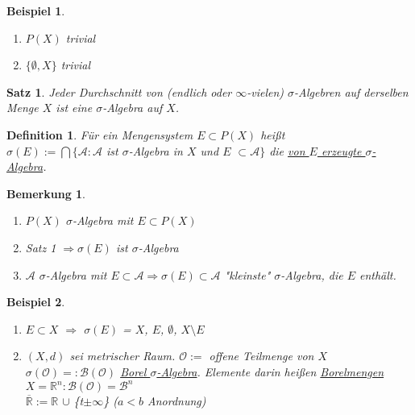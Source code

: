 \documentclass[11pt]{memoir}
\theoremstyle{break}
\newtheorem{Definition}{Definition}[chapter]
\newtheorem{Bemerkung}{Bemerkung}[chapter]
\newtheorem{Beispiel}{Beispiel}[chapter]
\newtheorem{Satz}{Satz}[chapter]
\begin{document}
\begin{Beispiel}
\begin{enumerate}
	\item $P(X)$ trivial
	\item $\{ \emptyset, X \}${} trivial
\end{enumerate}
\end{Beispiel}

\begin{Satz}
Jeder Durchschnitt von (endlich oder $\infty$-vielen) $\sigma$-Algebren auf derselben Menge $X$ ist eine $\sigma$-Algebra auf $X$.
\end{Satz}

\begin{Definition}
Für ein Mengensystem $E \subset P(X)$ heißt \\
$\sigma(E):=\bigcap \{ \mathscr{A}: \mathscr{A}$ ist $\sigma$-Algebra in $X$ und $E$ $\subset \mathscr{A} \}$ die \underline{von $E$ erzeugte $\sigma$-Algebra}.
\end{Definition}

\begin{Bemerkung}
\begin{enumerate}
	\item $P(X)$ $\sigma$-Algebra mit $E \subset P(X)$
	\item Satz 1 $\Rightarrow \sigma(E)$ ist $\sigma$-Algebra
	\item $\mathscr{A}$ $\sigma$-Algebra mit $E \subset \mathscr{A} \Rightarrow \sigma(E) \subset 		\mathscr{A}$ "kleinste"{} $\sigma$-Algebra, die $E$ enthält.
\end{enumerate}
\end{Bemerkung}

\begin{Beispiel}
\begin{enumerate}
	\item $E \subset X$ $\Rightarrow $ $\sigma(E)$ = \textbraceleft $X$, $E$, $\emptyset$, $X \setminus E$\textbraceright
	\item $(X, d)$ sei metrischer Raum. $\mathscr{O}:=$ \textbraceleft offene Teilmenge von $X$ \\
	$\sigma(\mathscr{O})=:\mathscr{B(O)}$ \underline{Borel $\sigma$-Algebra}. Elemente darin heißen \underline{Borelmengen} \\
	$X = \mathbb{R}^{n}: \mathscr{B(O)} = \mathscr{B}^{n}$ \\
	$\overline{\mathbb{R}} := \mathbb{R}$  $\cup$ \{t$\pm\infty$\} {}($a < b$ Anordnung)
\end{enumerate}
\end{Beispiel}
\end{document}
